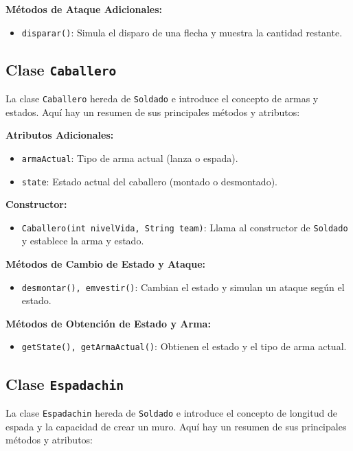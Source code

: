 \textbf{Métodos de Ataque Adicionales:}
\begin{itemize}
    \item \texttt{disparar()}: Simula el disparo de una flecha y muestra la cantidad restante.
\end{itemize}

\subsection{Clase \texttt{Caballero}}

La clase \texttt{Caballero} hereda de \texttt{Soldado} e introduce el concepto de armas y estados. Aquí hay un resumen de sus principales métodos y atributos:

\textbf{Atributos Adicionales:}
\begin{itemize}
    \item \texttt{armaActual}: Tipo de arma actual (lanza o espada).
    \item \texttt{state}: Estado actual del caballero (montado o desmontado).
\end{itemize}

\textbf{Constructor:}
\begin{itemize}
    \item \texttt{Caballero(int nivelVida, String team)}: Llama al constructor de \texttt{Soldado} y establece la arma y estado.
\end{itemize}

\textbf{Métodos de Cambio de Estado y Ataque:}
\begin{itemize}
    \item \texttt{desmontar(), emvestir()}: Cambian el estado y simulan un ataque según el estado.
\end{itemize}

\textbf{Métodos de Obtención de Estado y Arma:}
\begin{itemize}
    \item \texttt{getState(), getArmaActual()}: Obtienen el estado y el tipo de arma actual.
\end{itemize}

\subsection{Clase \texttt{Espadachin}}

La clase \texttt{Espadachin} hereda de \texttt{Soldado} e introduce el concepto de longitud de espada y la capacidad de crear un muro. Aquí hay un resumen de sus principales métodos y atributos:

